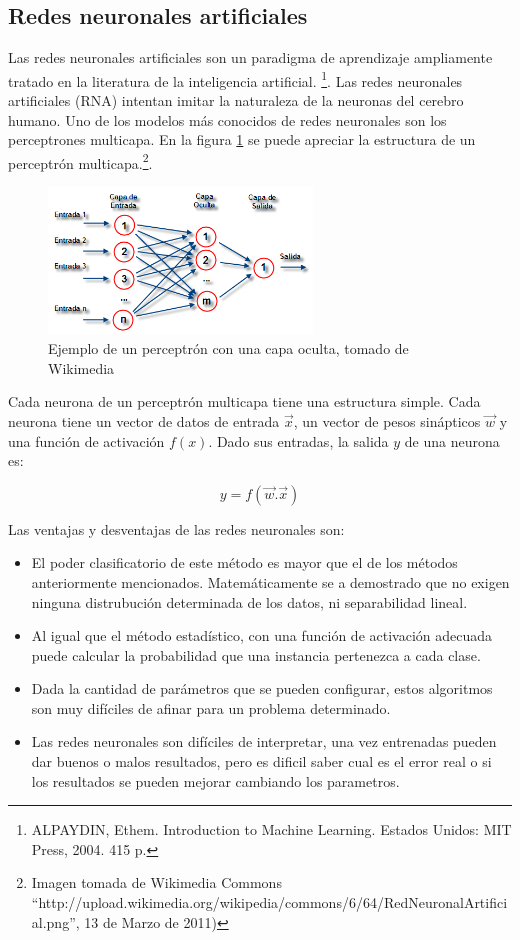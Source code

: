 \documentclass[a4paper, 11pt, oneside]{report}
\begin{document}
\subsection{Redes neuronales artificiales}

Las redes neuronales artificiales son un paradigma de aprendizaje ampliamente tratado en la literatura de la inteligencia artificial. \footnote{ALPAYDIN, Ethem. Introduction to Machine Learning. Estados Unidos: MIT Press, 2004. 415 p.}. Las redes neuronales artificiales (RNA) intentan imitar la naturaleza de la neuronas del cerebro humano. Uno de los modelos más conocidos de redes neuronales son los perceptrones multicapa. En la figura \ref{fig:rna} se puede apreciar la estructura de un perceptrón multicapa.\footnote{Imagen tomada de Wikimedia Commons ``http://upload.wikimedia.org/wikipedia/commons/6/64/RedNeuronalArtificial.png'', 13 de Marzo de 2011)}.

	\begin{figure}[htb]
	\begin{center}
	\leavevmode
	\includegraphics[width=7cm]{img/rna.png}
	\end{center}
	\caption{Ejemplo de un perceptrón con una capa oculta, tomado de Wikimedia}
	\label{fig:rna}
	\end{figure}

Cada neurona de un perceptrón multicapa tiene una estructura simple. Cada neurona tiene un vector de datos de entrada $\vec{x}$, un vector de pesos sinápticos $\vec{w}$ y una función de activación $f(x)$. Dado sus entradas, la salida $y$ de una neurona es:

\[y = f(\vec{w}.\vec{x})\]

Las ventajas y desventajas de las redes neuronales son:

\begin{itemize}
	\item El poder clasificatorio de este método es mayor que el de los métodos anteriormente mencionados. Matemáticamente se a demostrado que no exigen ninguna distrubución determinada de los datos, ni separabilidad lineal.
	\item Al igual que el método estadístico, con una función de activación adecuada puede calcular la probabilidad que una instancia pertenezca a cada clase.
	\item Dada la cantidad de parámetros que se pueden configurar, estos algoritmos son muy difíciles de afinar para un problema determinado.
	\item Las redes neuronales son difíciles de interpretar, una vez entrenadas pueden dar buenos o malos resultados, pero es dificil saber cual es el error real o si los resultados se pueden mejorar cambiando los parametros.
\end{itemize}
\end{document}
